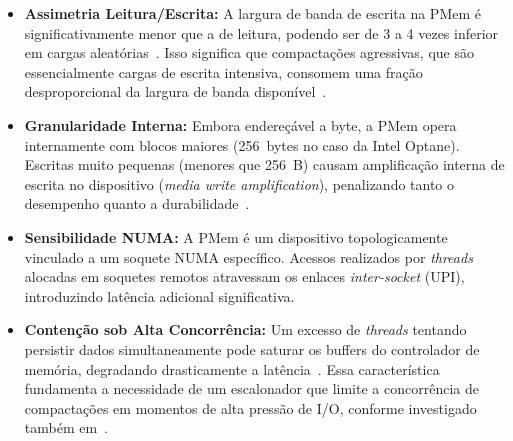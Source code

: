 \begin{itemize}
    \item \textbf{Assimetria Leitura/Escrita:} A largura de banda de escrita na
    PMem é significativamente menor que a de leitura, podendo ser de 3 a 4
    vezes inferior em cargas aleatórias~\cite{van_renen_2020}. Isso significa que
    compactações agressivas, que são essencialmente cargas de escrita intensiva,
    consomem uma fração desproporcional da largura de banda
    disponível~\cite{revisting_design_lsm}.

    \item \textbf{Granularidade Interna:} Embora endereçável a byte, a PMem opera
    internamente com blocos maiores (256~bytes no caso da Intel Optane). Escritas
    muito pequenas (menores que 256~B) causam amplificação interna de escrita no
    dispositivo (\textit{media write amplification}), penalizando tanto o
    desempenho quanto a durabilidade~\cite{van_renen_2020}.

    \item \textbf{Sensibilidade NUMA:} A PMem é um dispositivo topologicamente
    vinculado a um soquete NUMA específico. Acessos realizados por \textit{threads}
    alocadas em soquetes remotos atravessam os enlaces \textit{inter-socket} (UPI),
    introduzindo latência adicional significativa.

    \item \textbf{Contenção sob Alta Concorrência:} Um excesso de \textit{threads}
    tentando persistir dados simultaneamente pode saturar os buffers do controlador
    de memória, degradando drasticamente a latência~\cite{van_renen_2020}. Essa
    característica fundamenta a necessidade de um escalonador que limite a
    concorrência de compactações em momentos de alta pressão de I/O, conforme
    investigado também em~\cite{MatrixKV,FlatLSM}.
\end{itemize}
